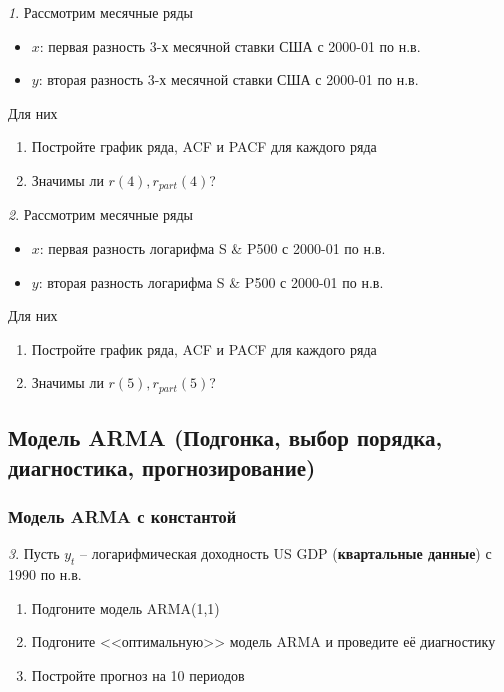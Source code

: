 \documentclass[12pt]{article}
\theoremstyle{remark}
\newtheorem{exercise}{}[subsection]
\begin{document}
\begin{exercise}
Рассмотрим месячные ряды
\begin{itemize}
	\item \(x\): первая разность 3-х месячной ставки США с 2000-01 по
	н.в.
	\item \(y\): вторая разность 3-х месячной ставки США с 2000-01 по
	н.в.
\end{itemize}
Для них
\begin{enumerate}
	\item Постройте график ряда, ACF и PACF для каждого ряда
	\item Значимы ли \(r(4),r_{part}(4)\)?
\end{enumerate}
\end{exercise}

\begin{exercise}
Рассмотрим месячные ряды
\begin{itemize}
	\item \(x\): первая разность логарифма S \& P500 с 2000-01 по
	н.в.
	\item \(y\): вторая разность логарифма S \& P500 с 2000-01 по
	н.в.
\end{itemize}
Для них
\begin{enumerate}
	\item Постройте график ряда, ACF и PACF для каждого ряда
	\item Значимы ли \(r(5),r_{part}(5)\)?
\end{enumerate}
\end{exercise}


\subsection{Модель ARMA (Подгонка, выбор порядка, диагностика, прогнозирование)}

\subsubsection{Модель ARMA с константой}

\begin{exercise}
Пусть \(y_t\) -- логарифмическая доходность US GDP (\textbf{квартальные данные}) с 1990 по н.в.
\begin{enumerate}
	\item Подгоните модель ARMA(1,1)
	\item Подгоните <<оптимальную>> модель ARMA и проведите её диагностику
	\item Постройте прогноз на 10 периодов
\end{enumerate}
\end{exercise}
\end{document}
